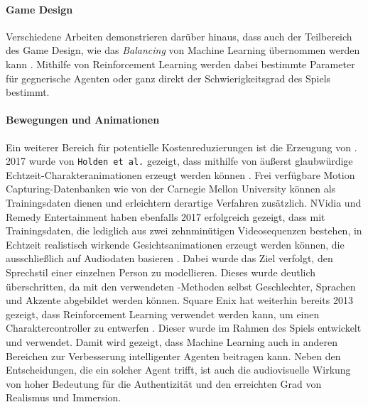 \paragraph{Game Design}
Verschiedene Arbeiten demonstrieren darüber hinaus, dass auch der Teilbereich des Game Design, wie das \textit{Balancing} von Machine Learning übernommen werden kann \cite{balancing_reinforcement_1} \cite{balancing_reinforcement_2} \cite{balancing_reinforcement_3}. Mithilfe von Reinforcement Learning werden dabei bestimmte Parameter für gegnerische Agenten oder ganz direkt der Schwierigkeitsgrad des Spiels bestimmt. 

\paragraph{Bewegungen und Animationen}
Ein weiterer Bereich für potentielle Kostenreduzierungen ist die Erzeugung von . 2017 wurde von \texttt{Holden et al.} gezeigt, dass mithilfe von  äußerst glaubwürdige Echtzeit-Charakteranimationen erzeugt werden können \cite{holden_paper} \cite{holden_github}. Frei verfügbare Motion Capturing-Datenbanken wie  von der Carnegie Mellon University \cite{mocap} können als Trainingsdaten dienen und erleichtern derartige Verfahren zusätzlich. NVidia und Remedy Entertainment haben ebenfalls 2017 erfolgreich gezeigt, dass mit Trainingsdaten, die lediglich aus zwei zehnminütigen Videosequenzen bestehen, in Echtzeit realistisch wirkende Gesichtsanimationen erzeugt werden können, die ausschließlich auf Audiodaten basieren \cite{nvidia_face_paper} \cite{nvidia_face_website}. Dabei wurde das Ziel verfolgt, den Sprechstil einer einzelnen Person zu modellieren. Dieses wurde deutlich überschritten, da mit den verwendeten -Methoden selbst Geschlechter, Sprachen und Akzente abgebildet werden können.
Square Enix hat weiterhin bereits 2013 gezeigt, dass Reinforcement Learning verwendet werden kann, um einen Charaktercontroller zu entwerfen \cite{hitman_gdc}. Dieser wurde im Rahmen des Spiels  \cite{hitman} entwickelt und verwendet. Damit wird gezeigt, dass Machine Learning auch in anderen Bereichen zur Verbesserung intelligenter Agenten beitragen kann. Neben den Entscheidungen, die ein solcher Agent trifft, ist auch die audiovisuelle Wirkung von hoher Bedeutung für die Authentizität und den erreichten Grad von Realismus und Immersion.



